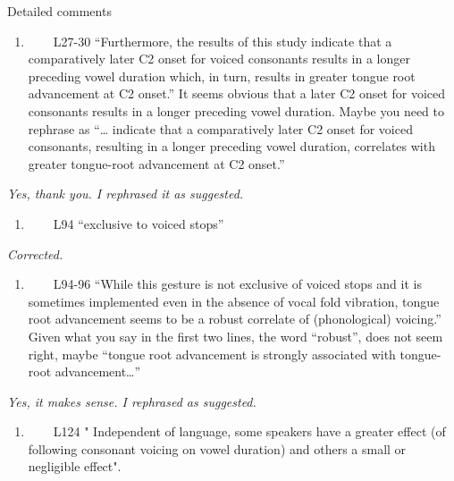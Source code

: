 \documentclass[]{article}
\providecommand{\tightlist}{%
  \setlength{\itemsep}{0pt}\setlength{\parskip}{0pt}}
\begin{document}
Detailed comments

\begin{enumerate}
\def\labelenumi{\arabic{enumi}.}
\tightlist
\item
  ~~~~L27-30 ``Furthermore, the results of this study indicate that a
  comparatively later C2 onset for voiced consonants results in a longer
  preceding vowel duration which, in turn, results in greater tongue
  root advancement at C2 onset.'' It seems obvious that a later C2 onset
  for voiced consonants results in a longer preceding vowel duration.
  Maybe you need to rephrase as ``\ldots{} indicate that a comparatively
  later C2 onset for voiced consonants, resulting in a longer preceding
  vowel duration, correlates with greater tongue-root advancement at C2
  onset.''
\end{enumerate}

\begin{adjustwidth}{1cm}{} \textit{
Yes, thank you. I rephrased it as suggested.
} \end{adjustwidth}

\begin{enumerate}
\def\labelenumi{\arabic{enumi}.}
\setcounter{enumi}{1}
\tightlist
\item
  ~~~~L94 ``exclusive to voiced stops''
\end{enumerate}

\begin{adjustwidth}{1cm}{} \textit{
Corrected.
} \end{adjustwidth}

\begin{enumerate}
\def\labelenumi{\arabic{enumi}.}
\setcounter{enumi}{2}
\tightlist
\item
  ~~~~L94-96 ``While this gesture is not exclusive of voiced stops and
  it is sometimes implemented even in the absence of vocal fold
  vibration, tongue root advancement seems to be a robust correlate of
  (phonological) voicing.'' Given what you say in the first two lines,
  the word ``robust'', does not seem right, maybe ``tongue root
  advancement is strongly associated with tongue-root
  advancement\ldots{}''
\end{enumerate}

\begin{adjustwidth}{1cm}{} \textit{
Yes, it makes sense. I rephrased as suggested.
} \end{adjustwidth}

\begin{enumerate}
\def\labelenumi{\arabic{enumi}.}
\setcounter{enumi}{3}
\tightlist
\item
  ~~~~L124 " Independent of language, some speakers have a greater
  effect (of following consonant voicing on vowel duration) and others a
  small or negligible effect".
\end{enumerate}
\end{document}
